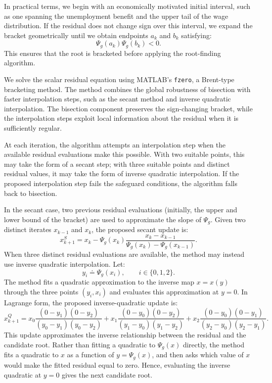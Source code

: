 \documentclass{article}
\begin{document}
In practical terms, we begin with an economically motivated initial interval, such as one spanning the unemployment benefit and the upper tail of the wage distribution. If the residual does not change sign over this interval, we expand the bracket geometrically until we obtain endpoints $a_k$ and $b_k$ satisfying:
\[
\Psi_g(a_k)\Psi_g(b_k)<0.
\]
This ensures that the root is bracketed before applying the root-finding algorithm.

We solve the scalar residual equation using MATLAB's \texttt{fzero}, a Brent-type bracketing method. The method combines the global robustness of bisection with faster interpolation steps, such as the secant method and inverse quadratic interpolation. The bisection component preserves the sign-changing bracket, while the interpolation steps exploit local information about the residual when it is sufficiently regular.

At each iteration, the algorithm attempts an interpolation step when the available residual evaluations make this possible. With two suitable points, this may take the form of a secant step; with three suitable points and distinct residual values, it may take the form of inverse quadratic interpolation. If the proposed interpolation step fails the safeguard conditions, the algorithm falls back to bisection.

In the secant case, two previous residual evaluations (initially, the upper and lower bound of the bracket) are used to approximate the slope of $\Psi_g$. Given two distinct iterates $x_{k-1}$ and $x_k$, the proposed secant update is:
\[
x_{k+1}^{S}
=
x_k
-
\Psi_g(x_k)
\frac{x_k-x_{k-1}}
{\Psi_g(x_k)-\Psi_g(x_{k-1})}.
\]
When three distinct residual evaluations are available, the method may instead use inverse quadratic interpolation. Let:
\[
y_i\doteq \Psi_g(x_i), \qquad i\in\{0,1,2\}.
\]
The method fits a quadratic approximation to the inverse map $x=x(y)$ through the three points $(y_i,x_i)$ and evaluates this approximation at $y=0$. In Lagrange form, the proposed inverse-quadratic update is:
\[
x_{k+1}^{Q}
=
x_0
\frac{(0-y_1)(0-y_2)}{(y_0-y_1)(y_0-y_2)}
+
x_1
\frac{(0-y_0)(0-y_2)}{(y_1-y_0)(y_1-y_2)}
+
x_2
\frac{(0-y_0)(0-y_1)}{(y_2-y_0)(y_2-y_1)}.
\]
This update approximates the inverse relationship between the residual and the candidate root. Rather than fitting a quadratic to $\Psi_g(x)$ directly, the method fits a quadratic to $x$ as a function of $y=\Psi_g(x)$, and then asks which value of $x$ would make the fitted residual equal to zero. Hence, evaluating the inverse quadratic at $y=0$ gives the next candidate root.
\end{document}
